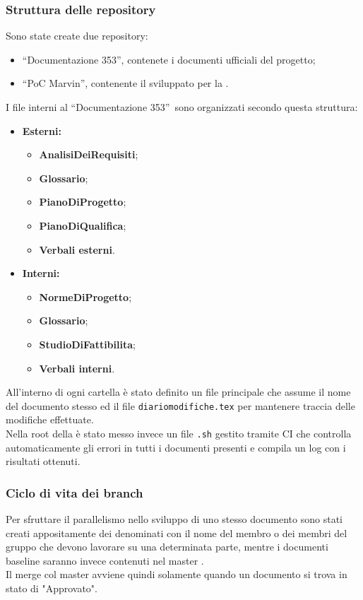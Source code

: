 \documentclass[NormeDiProgetto.tex]{subfiles}
\begin{document}
	\subsubsection{Struttura delle repository}
	Sono state create due repository:
	\begin{itemize}
		\item \textquotedblleft Documentazione 353\textquotedblright, contenete i documenti ufficiali del progetto;
		\item \textquotedblleft PoC Marvin\textquotedblright, contenente il \poc sviluppato per la \tb.
	\end{itemize}
	
	I file interni al  \textquotedblleft Documentazione 353\textquotedblright\ sono organizzati secondo questa struttura:
	\begin{itemize}
		\item \textbf{Esterni:}
				\begin{itemize}
				\item \textbf{AnalisiDeiRequisiti};
				\item \textbf{Glossario};
				\item \textbf{PianoDiProgetto};
				\item \textbf{PianoDiQualifica};
				\item \textbf{Verbali esterni}.
			\end{itemize}
		\item \textbf{Interni:}
				\begin{itemize}
					\item \textbf{NormeDiProgetto};
					\item \textbf{Glossario};
					\item \textbf{StudioDiFattibilita};
					\item \textbf{Verbali interni}.
				\end{itemize}		
	\end{itemize}	
	All'interno di ogni cartella è stato definito un file  principale che assume il nome del documento stesso ed il file \texttt{diariomodifiche.tex} per mantenere traccia delle modifiche effettuate.\\
	Nella root della  è stato messo invece un file \texttt{.sh} gestito tramite  CI che controlla automaticamente gli errori in tutti i documenti presenti e compila un log con i risultati ottenuti.
	
	\subsubsection{Ciclo di vita dei branch}
	Per sfruttare il parallelismo nello sviluppo di uno stesso documento sono stati creati appositamente dei  denominati con il nome del membro o dei membri del gruppo che devono lavorare su una determinata parte, mentre i documenti baseline saranno invece contenuti nel master .\\
	Il merge col master avviene quindi solamente quando un documento si trova in stato di "Approvato".
	
\end{document}

